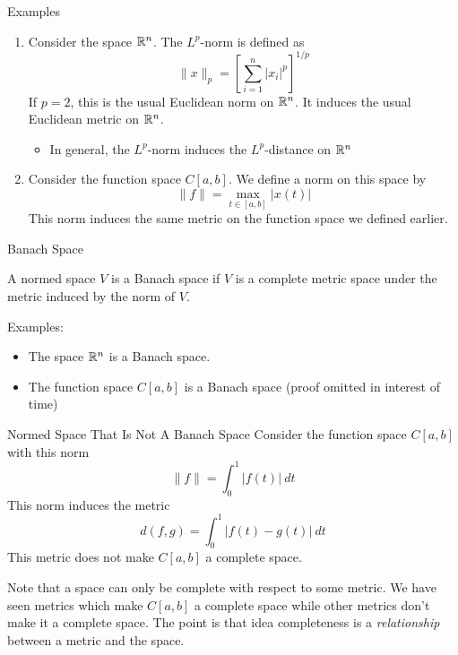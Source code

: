 \documentclass[10pt]{beamer}
\begin{document}
		\begin{frame}{Examples}
				\begin{enumerate}
						\item<1-> Consider the space $\mathbb{R}^n$. The $L^p$-norm is defined as 
								\begin{equation*}
										\|x\|_p = \left[ \sum_{i=1}^{n} |x_i|^p \right]^{1/p}
								\end{equation*}
								If $p = 2$, this is the usual Euclidean norm on $\mathbb{R}^n$. It induces the usual Euclidean metric on $\mathbb{R}^n$. 
								\begin{itemize}
										\item In general, the $L^p$-norm induces the $L^p$-distance on $\mathbb{R}^n$
								\end{itemize}

						\item<2-> Consider the function space $C[a,b]$. We define a norm on this space by 
								\begin{equation*}
										\|f\| = \max_{t\in [a,b]} |x(t)|
								\end{equation*}
								This norm induces the same metric on the function space we defined earlier. 
				\end{enumerate}
		\end{frame}

		\begin{frame}{Banach Space}
				\begin{definition}
						A normed space $V$ is a \alert{Banach space} if $V$ is a complete metric space under the metric induced by the norm of $V$. 
				\end{definition}
				Examples: 
				\begin{itemize}
						\item<1-> The space $\mathbb{R}^n$ is a Banach space. 
						\item<2-> The function space $C[a,b]$ is a Banach space (proof omitted in interest of time)
				\end{itemize}
		\end{frame}

		\begin{frame}{Normed Space That Is Not A Banach Space}
				Consider the function space $C[a,b]$ with this norm 
				\begin{equation*}
						\|f\| = \int_0^1 |f(t)|\ dt 
				\end{equation*}
				This norm induces the metric 
				\begin{equation*}
						d(f, g) = \int_0^1 |f(t) - g(t)|\ dt
				\end{equation*}
				This metric does not make $C[a,b]$ a complete space. 
				\begin{block}{}
						Note that a space can only be complete with respect to some metric. We have seen metrics which make $C[a,b]$ a complete space while other metrics don't make it a complete space. The point is that idea completeness is a \emph{relationship} between a metric and the space. 
				\end{block}
		\end{frame}
\end{document}
